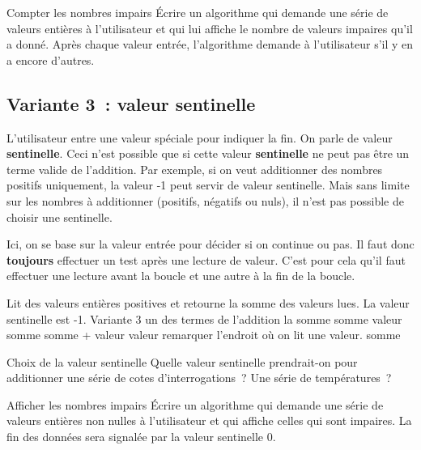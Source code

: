 		\begin{Exercice}{Compter les nombres impairs}
			Écrire un algorithme qui demande une série
			de valeurs entières à l’utilisateur
			et qui lui affiche le nombre de valeurs impaires
			qu’il a donné.
			Après chaque valeur entrée,
			l’algorithme demande à l’utilisateur s’il y en a encore d’autres.
		\end{Exercice}

	\subsection{Variante 3~: valeur sentinelle}
		
		L’utilisateur entre une valeur spéciale pour indiquer la fin. 
		On parle de valeur \textbf{sentinelle}. 
		Ceci n’est possible que si cette valeur \textbf{sentinelle} ne peut pas être
		un terme valide de l’addition. Par exemple, si on veut
		additionner des nombres positifs uniquement, la valeur -1 peut servir
		de valeur sentinelle. Mais sans limite sur les nombres à additionner
		(positifs, négatifs ou nuls), il n’est pas possible de
		choisir une sentinelle.

		Ici, on se base sur la valeur entrée pour décider si on continue ou pas. 
		Il faut donc \textbf{toujours} effectuer un test
		après une lecture de valeur. C’est pour cela
		qu’il faut effectuer une lecture avant la boucle
		et une autre à la fin de la boucle.

		\begin{LDA}
		\LComment Lit des valeurs entières positives et retourne la somme des valeurs lues.
		\LComment La valeur sentinelle est -1.
		 \RComment Variante 3
			 \RComment un des termes de l’addition
			 \RComment la somme
			\Let somme 
			\Read valeur
				\Let somme \Gets somme + valeur 
				\Read valeur \RComment remarquer l’endroit où on lit une valeur.
			\EndWhile
			\Return somme
		\EndAlgo
		\end{LDA}

		\begin{Exercice}{Choix de la valeur sentinelle}
			Quelle valeur sentinelle prendrait-on 
			pour additionner une série de cotes d’interrogations~? 
			Une série de températures~?
		\end{Exercice}

		\begin{Exercice}{Afficher les nombres impairs}
			Écrire un algorithme qui demande une série
			de valeurs entières non nulles à l’utilisateur
			et qui affiche celles qui sont impaires.
			La fin des données sera signalée 
			par la valeur sentinelle 0.
		\end{Exercice}

